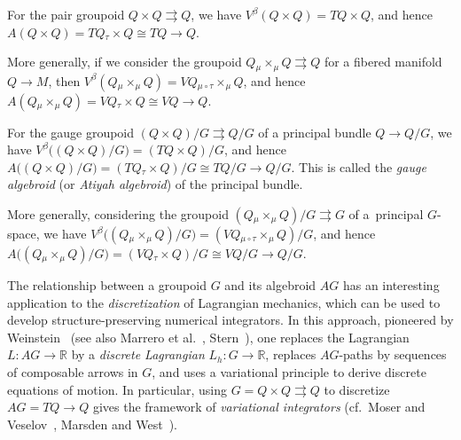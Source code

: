 \documentclass[pdftex]{sigma}
\numberwithin{equation}{section}
\begin{document}
\begin{Example} \label{ex:verticalAlgebroid} For the pair groupoid $ Q \times Q \rightrightarrows Q $, we have $ V ^\beta ( Q \times Q ) = T Q \times Q $, and hence $ A ( Q \times Q ) = T Q \mathbin{ _\tau \times } Q \cong T Q \rightarrow Q $.

More generally, if we consider the groupoid $ Q \mathbin{ _\mu \times _\mu } Q \rightrightarrows Q $ for a f\/ibered manifold $ Q \rightarrow M $, then $ V ^\beta ( Q \mathbin{ _\mu \times _\mu } Q ) = V Q \mathbin{ _{\mu \circ \tau } \times _\mu } Q $, and hence $ A ( Q \mathbin{ _\mu \times _\mu } Q ) = V Q \mathbin{ _\tau \times } Q \cong V Q \rightarrow Q $.
\end{Example}

\begin{Example} \label{ex:gaugeAlgebroid}
For the gauge groupoid $ ( Q \times Q ) / G \rightrightarrows Q / G $ of a principal bundle $ Q \rightarrow Q / G $, we have $ V ^\beta \bigl( ( Q \times Q ) / G \bigr) = (T Q \times Q) / G $, and hence $ A \bigl( ( Q \times Q ) / G \bigr) = ( T Q \mathbin{ _\tau \times } Q ) / G \cong T Q / G \rightarrow Q / G $. This is called the \emph{gauge algebroid} (or \emph{Atiyah algebroid}) of the principal bundle.

More generally, considering the groupoid $ (Q \mathbin{ _\mu \times _\mu } Q) / G \rightrightarrows G $ of a~principal $G$-space, we have $ V ^\beta \bigl( (Q \mathbin{ _\mu \times _\mu } Q) / G \bigr) = ( V Q \mathbin{ _{ \mu \circ \tau } \times _\mu } Q ) / G $, and hence $ A \bigl( (Q \mathbin{ _\mu \times _\mu } Q) / G \bigr) = ( V Q \mathbin{ _\tau \times } Q ) / G \cong V Q / G \rightarrow Q / G $.
\end{Example}

\begin{Remark} The relationship between a groupoid $G$ and its algebroid $ A G $ has an interesting application to the \emph{discretization} of Lagrangian mechanics, which can be used to develop structure-preserving numerical integrators. In this approach, pioneered by Weinstein~\cite{Weinstein1996} (see also Marrero et al.~\cite{MaMaMa2006,MaMaSt2015}, Stern~\cite{Stern2010}), one replaces the Lagrangian $ L \colon A G \rightarrow \mathbb{R} $ by a \emph{discrete Lagrangian} $ L _h \colon G \rightarrow \mathbb{R} $, replaces $AG$-paths by sequences of composable arrows in $G$, and uses a variational principle to derive discrete equations of motion. In particular, using $ G = Q \times Q \rightrightarrows Q $
to discretize $ A G = T Q \rightarrow Q $ gives the framework of \emph{variational integrators} (cf.\ Moser and Veselov~\cite{MoVe1991}, Marsden and West~\cite{MaWe2001}).
\end{Remark}
\end{document}
